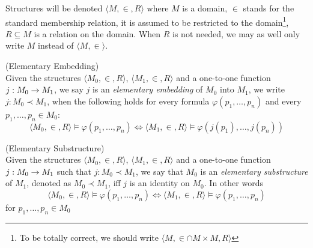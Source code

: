 Structures will be denoted $\langle M, \in, R \rangle$ where $M$ is a domain, $\in$ stands for the standard membership relation, it is assumed to be restricted to the domain\footnote{To be totally correct, we should write $\langle M, \in \cap M \times M, R \rangle$}, $R \subseteq M$ is a relation on the domain. When $R$ is not needed, we may as well only write $M$ instead of $\langle M, \in \rangle$.

\begin{definition}{(Elementary Embedding)}\label{def:elementary_embedding}\\
Given the structures $\langle M_0, \in, R \rangle$, $\langle M_1, \in, R \rangle$ and a one-to-one function $j: M_0 \rightarrow M_1$, we say $j$ is an \emph{elementary embedding} of $M_0$ into $M_1$, we write $j: M_0 \prec M_1$, when the following holds for every formula $\varphi(p_1, \ldots, p_n)$ and every $p_1, \ldots, p_n \in M_0$:
\begin{equation}
\langle M_0, \in, R \rangle \models \varphi(p_1, \ldots, p_n) \iff \langle M_1, \in, R \rangle  \models \varphi(j(p_1), \ldots, j(p_n))
\end{equation}
\end{definition}


\begin{definition}{(Elementary Substructure)}\label{def:elementary_substructure}\\
Given the structures $\langle M_0, \in, R \rangle$, $\langle M_1, \in, R \rangle$ and a one-to-one function $j: M_0 \rightarrow M_1$ such that $j: M_0 \prec M_1$, we say that $M_0$ is an \emph{elementary substructure} of $M_1$, denoted as $M_0 \prec M_1$, iff $j$ is an identity on $M_0$. In other words
\begin{equation}
\langle M_0, \in, R \rangle \models \varphi(p_1, \ldots, p_n) \iff \langle M_1, \in, R \rangle  \models \varphi(p_1, \ldots, p_n)
\end{equation}
for $p_1, \ldots, p_n \in M_0$
\end{definition}



